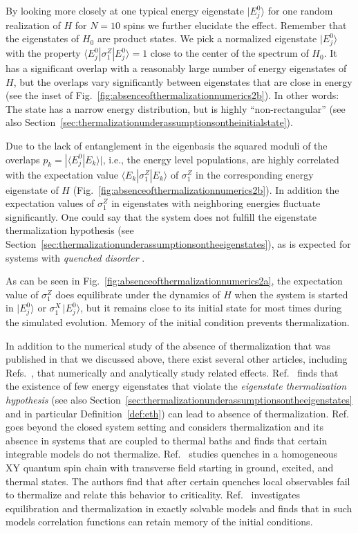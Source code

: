 \documentclass[a4paper,12pt,listof=totoc,index=totoc,bibliography=totoc,headsepline=false,headings=normal,BCOR16.153846mm,DIV12,headinclude,twoside,cleardoublepage=empty,numbers=noenddot,final]{scrreprt}
\theoremstyle{mystyle}
\numberwithin{equation}{section}
\numberwithin{figure}{section}
\numberwithin{lemma}{section}
\numberwithin{theorem}{section}
\numberwithin{corollary}{section}
\numberwithin{definition}{section}
\numberwithin{conjecture}{section}
\numberwithin{observation}{section}
\newcommand{\+}{\mkern2mu}
\renewcommand{\H}{H}
\newcommand{\bra}[1]{\langle #1|}
\newcommand{\ket}[1]{|#1\rangle}
\newcommand{\braket}[2]{\langle #1 | #2 \rangle}
\DeclareMathOperator{\1}{\mathds{1}}
\begin{document}
By looking more closely at one typical energy eigenstate $\ket{E^0_j}$ for one random realization of $\H$ for $N=10$ spins we further elucidate the effect.
Remember that the eigenstates of $\H_0$ are product states.
We pick a normalized eigenstate $\ket{E_j^0}$ with the property $\bra{E^0_j} \sigma^Z_1 \ket{E_j^0} = 1$ close to the center of the spectrum of $\H_0$.
It has a significant overlap with a reasonably large number of energy eigenstates of $\H$, but the overlaps vary significantly between eigenstates that are close in energy (see the inset of Fig.~\ref{fig:absenceofthermalizationnumerics2b}).
In other words: The state has a narrow energy distribution, but is highly ``non-rectangular'' (see also Section~\ref{sec:thermalizationunderassumptionsontheinitialstate}).

Due to the lack of entanglement in the eigenbasis the squared moduli of the overlaps $p_k = |\braket{E^0_j}{E_k}|$, i.e., the energy level populations, are highly correlated with the expectation value $\bra{E_k}\sigma^Z_1\ket{E_k}$ of $\sigma^Z_1$ in the corresponding energy eigenstate of $\H$ (Fig.~\ref{fig:absenceofthermalizationnumerics2b}).
In addition the expectation values of $\sigma^Z_1$ in eigenstates with neighboring energies fluctuate significantly.
One could say that the system does not fulfill the eigenstate thermalization hypothesis (see Section~\ref{sec:thermalizationunderassumptionsontheeigenstates}), as is expected for systems with \emph{quenched disorder} \cite{PhysRevB.82.17}.

As can be seen in Fig.~\ref{fig:absenceofthermalizationnumerics2a}, the expectation value of $\sigma^Z_1$ does equilibrate under the dynamics of $\H$ when the system is started in $\ket{E^0_j}$ or $\sigma^X_1\,\ket{E^0_j}$, but it remains close to its initial state for most times during the simulated evolution.
Memory of the initial condition prevents thermalization.

In addition to the numerical study of the absence of thermalization that was published in \cite{PhysRevLett.10-6} that we discussed above, there exist several other articles, including Refs.~\cite{1011.0781v1,Cazalilla11,Biroli09,Znidaric09}, that numerically and analytically study related effects.
Ref.~\cite{Biroli09} finds that the existence of few energy eigenstates that violate the \emph{eigenstate thermalization hypothesis} (see also Section~\ref{sec:thermalizationunderassumptionsontheeigenstates} and in particular Definition~\ref{def:eth}) can lead to absence of thermalization.
Ref.~\cite{Znidaric09} goes beyond the closed system setting and considers thermalization and its absence in systems that are coupled to thermal baths and finds that certain integrable models do not thermalize.
Ref.~\cite{1011.0781v1} studies quenches in a homogeneous XY quantum spin chain with transverse field starting in ground, excited, and thermal states.
The authors find that after certain quenches local observables fail to thermalize and relate this behavior to criticality.
Ref.~\cite{Cazalilla11} investigates equilibration and thermalization in exactly solvable models and finds that in such models correlation functions can retain memory of the initial conditions.
\end{document}
